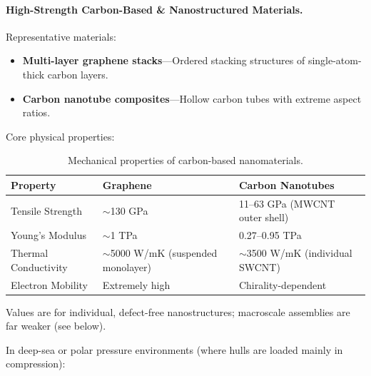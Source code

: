 \documentclass[aps,prd,twocolumn,superscriptaddress,nofootinbib]{revtex4-2}
\begin{document}
\paragraph{High-Strength Carbon-Based \& Nanostructured Materials.}\label{sec:carbon-materials}

Representative materials:

\begin{itemize}
  \item \textbf{Multi-layer graphene stacks}---Ordered stacking structures of single-atom-thick carbon layers.
  \item \textbf{Carbon nanotube composites}---Hollow carbon tubes with extreme aspect ratios.
\end{itemize}

Core physical properties:

\begin{table}[htbp]
\caption{Mechanical properties of carbon-based nanomaterials.}
\label{tab:carbon-materials}
\begin{tabular}{lll}
\toprule
Property & Graphene & Carbon Nanotubes \\
\midrule
Tensile Strength & ${\sim}$130 GPa~\cite{Lee2008} & 11--63 GPa (MWCNT outer shell)~\cite{Yu2000} \\
Young's Modulus & ${\sim}$1 TPa~\cite{Lee2008} & 0.27--0.95 TPa~\cite{Yu2000} \\
Thermal Conductivity & ${\sim}$5000 W/mK (suspended monolayer)~\cite{Balandin2008} & ${\sim}$3500 W/mK (individual SWCNT)~\cite{Pop2006} \\
Electron Mobility & Extremely high & Chirality-dependent \\
\bottomrule
\end{tabular}
\end{table}

Values are for individual, defect-free nanostructures; macroscale assemblies are far weaker (see below).

In deep-sea or polar pressure environments (where hulls are loaded mainly in compression):
\end{document}
